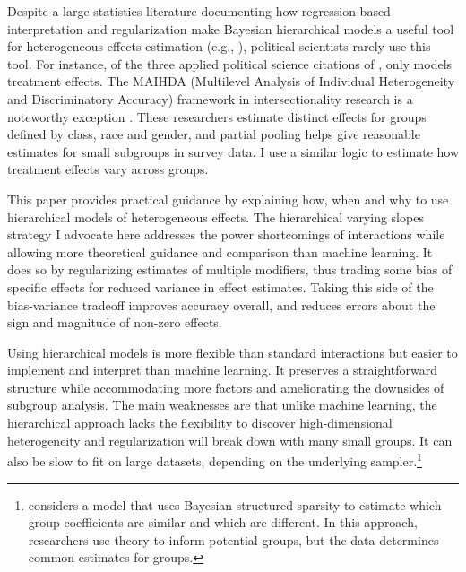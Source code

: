 \documentclass[12pt]{article}
\begin{document}
Despite a large statistics literature documenting how regression-based interpretation and regularization make Bayesian hierarchical models a useful tool for heterogeneous effects estimation (e.g., \cite{FellerGelman2015, McElreath2016, Dorieetal2022}), political scientists rarely use this tool. 
For instance, of the three applied political science citations of \citet{FellerGelman2015}, only \citet{Marquardt2022} models treatment effects. 
The MAIHDA (Multilevel Analysis of Individual Heterogeneity and Discriminatory Accuracy) framework in intersectionality research is a noteworthy exception \citep[e.g.][]{Much2025}. 
These researchers estimate distinct effects for groups defined by class, race and gender, and partial pooling helps give reasonable estimates for small subgroups in survey data.
I use a similar logic to estimate how treatment effects vary across groups.



This paper provides practical guidance by explaining how, when and why to use hierarchical models of heterogeneous effects.
The hierarchical varying slopes strategy I advocate here addresses the power shortcomings of interactions while allowing more theoretical guidance and comparison than machine learning.
It does so by regularizing estimates of multiple modifiers, thus trading some bias of specific effects for reduced variance in effect estimates.
Taking this side of the bias-variance tradeoff improves accuracy overall, and reduces errors about the sign and magnitude of non-zero effects.


Using hierarchical models is more flexible than standard interactions but easier to implement and interpret than machine learning.  
It preserves a straightforward structure while accommodating more factors and ameliorating the downsides of subgroup analysis. 
The main weaknesses are that unlike machine learning, the hierarchical approach lacks the flexibility to discover high-dimensional heterogeneity and regularization will break down with many small groups.
It can also be slow to fit on large datasets, depending on the underlying sampler.\footnote{\citet{Goplerud2021} considers a model that uses Bayesian structured sparsity to estimate which group coefficients are similar and which are different. In this approach, researchers use theory to inform potential groups, but the data determines common estimates for groups.} 
\end{document}
